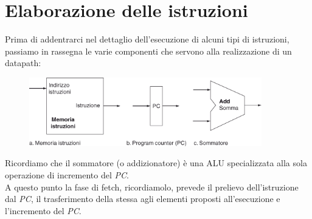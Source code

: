 \documentclass[class=book, crop=false, oneside]{standalone}
\begin{document}
\section{Elaborazione delle istruzioni}
Prima di addentrarci nel dettaglio dell'esecuzione di alcuni tipi di istruzioni, passiamo in rassegna le varie componenti che servono alla realizzazione di un datapath:
\begin{figure}[H]
	\centering
	\includegraphics[width=0.9\textwidth,keepaspectratio]{datap_3}
\end{figure}
Ricordiamo che il sommatore (o addizionatore) è una ALU specializzata alla sola operazione di incremento del \emph{PC}.\\
A questo punto la fase di fetch, ricordiamolo, prevede il prelievo dell'istruzione dal \emph{PC}, il trasferimento della stessa agli elementi proposti all'esecuzione e l'incremento del \emph{PC}.
\end{document}
